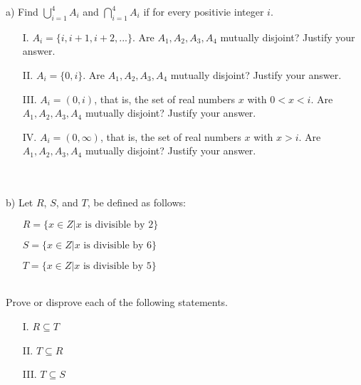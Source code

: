 \documentclass[12pt]{article}
\begin{document}
a) Find $\bigcup_{i=1}^{4}A_i$ and $\bigcap_{i=1}^{4}A_i$ if for every positivie integer $i$.
\begin{itemize}
  \item [I.] $A_i = \{i, i+1, i+2, ...\}$. Are $A_1, A_2, A_3, A_4$ mutually disjoint? Justify your answer.
  \item [II.] $A_i = \{0, i\}$. Are $A_1, A_2, A_3, A_4$ mutually disjoint? Justify your answer.
  \item [III.] $A_i = (0,i)$, that is, the set of real numbers $x$ with $0<x<i$. Are $A_1, A_2, A_3, A_4$ mutually disjoint? Justify your answer.
  \item [IV.] $A_i = (0,\infty)$, that is, the set of real numbers $x$ with $x>i$. Are $A_1, A_2, A_3, A_4$ mutually disjoint? Justify your answer.
\end{itemize}
\newblock
\\ \\
b) Let $R$, $S$, and $T$, be defined as follows:
\begin{itemize}
  \item [] $R = \{x \in Z | x \text{ is divisible by } 2\}$ \\
  \item [] $S = \{x \in Z | x \text{ is divisible by } 6\}$ \\
  \item [] $T = \{x \in Z | x \text{ is divisible by } 5\}$
\end{itemize}
\newblock
\\
Prove or disprove each of the following statements.
\begin{itemize}
  \item [I.] $R \subseteq T$
  \item [II.] $T \subseteq R$
  \item [III.] $T \subseteq S$
\end{itemize}
\end{document}
